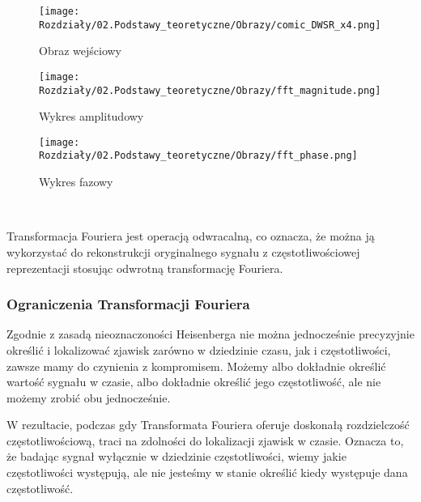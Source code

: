 \begin{figure}[ht]
    \centering
    \begin{minipage}[t]{0.325\linewidth}
        \texttt{[image: Rozdziały/02.Podstawy\_teoretyczne/Obrazy/comic\_DWSR\_x4.png]}
        \caption{Obraz wejściowy \cite{zeyde2010single}}
        \label{fig:image24}
    \end{minipage}
    \begin{minipage}[t]{0.325\linewidth}
        \texttt{[image: Rozdziały/02.Podstawy\_teoretyczne/Obrazy/fft\_magnitude.png]}
        \caption{Wykres amplitudowy}
        \label{fig:image25}
    \end{minipage}
    \begin{minipage}[t]{0.325\linewidth}
        \texttt{[image: Rozdziały/02.Podstawy\_teoretyczne/Obrazy/fft\_phase.png]}
        \caption{Wykres fazowy}
        \label{fig:image26}
    \end{minipage}
\end{figure}\

Transformacja Fouriera jest operacją odwracalną, co oznacza, że można ją wykorzystać do rekonstrukcji oryginalnego sygnału z częstotliwościowej reprezentacji stosując odwrotną transformację Fouriera.


\subsubsection{Ograniczenia Transformacji Fouriera}

Zgodnie z zasadą nieoznaczoności Heisenberga nie można jednocześnie precyzyjnie określić i lokalizować zjawisk zarówno w dziedzinie czasu, jak i częstotliwości, zawsze mamy do czynienia z kompromisem. 
Możemy albo dokładnie określić wartość sygnału w czasie, albo dokładnie określić jego częstotliwość, ale nie możemy zrobić obu jednocześnie.

W rezultacie, podczas gdy Transformata Fouriera oferuje doskonałą rozdzielczość częstotliwościową, traci na zdolności do lokalizacji zjawisk w czasie. Oznacza to, że badając sygnał wyłącznie w dziedzinie częstotliwości, wiemy jakie częstotliwości występują, ale nie jesteśmy w stanie określić kiedy występuje dana częstotliwość.

